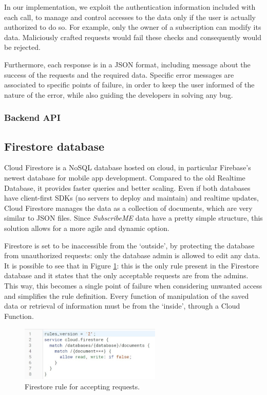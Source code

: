 \documentclass[11pt]{article}
\begin{document}
In our implementation, we exploit the authentication information included with each call, to manage and control accesses to the data only if the user is actually authorized to do so. For example, only the owner of a subscription can modify its data. Maliciously crafted requests would fail these checks and consequently would be rejected.

Furthermore, each response is in a JSON format, including message about the success of the requests and the required data. Specific error messages are associated to specific points of failure, in order to keep the user informed of the nature of the error, while also guiding the developers in solving any bug.

\subsubsection{Backend API}

\subsection{Firestore database}
Cloud Firestore is a NoSQL database hosted on cloud, in particular Firebase's newest database for mobile app development. Compared to the old Realtime Database, it provides faster queries and better scaling. Even if both databases have client-first SDKs (no servers to deploy and maintain) and realtime updates, Cloud Firestore manages the data as a collection of documents, which are very similar to JSON files. Since \textit{SubscribeME} data have a pretty simple structure, this solution allows for a more agile and dynamic option.

Firestore is set to be inaccessible from the `outside', by protecting the database from unauthorized requests: only the database admin is allowed to edit any data. It is possible to see that in Figure \ref{fig:rule}: this is the only rule present in the Firestore database and it states that the only acceptable requests are from the admins. This way, this becomes a single point of failure when considering unwanted access and simplifies the rule definition. Every function of manipulation of the saved data or retrieval of information must be from the `inside', through a Cloud Function.

\begin{figure}[h!]
    \begin{center}
        \includegraphics[width=0.6\textwidth, clip]{../../assets/firestoreRule.jpg}
    \end{center}
    \caption{Firestore rule for accepting requests.}
    \label{fig:rule}
\end{figure}
\end{document}
